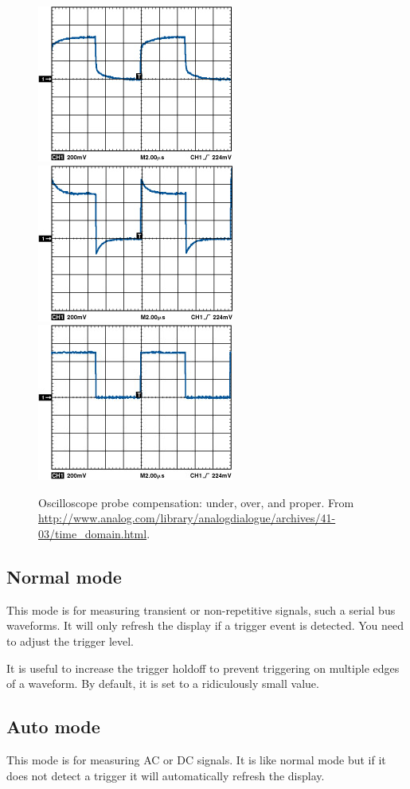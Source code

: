 \begin{figure}[!h]
  \centering
  \includegraphics[width=0.3\columnwidth]{figs/probe-undercompensated}
  \includegraphics[width=0.3\columnwidth]{figs/probe-overcompensated}
  \includegraphics[width=0.3\columnwidth]{figs/probe-compensated}
  \caption{Oscilloscope probe compensation: under, over, and proper.
    From
    \url{http://www.analog.com/library/analogdialogue/archives/41-03/time_domain.html}.}
\end{figure}


\subsection{Normal mode}
\label{normal-mode}

This mode is for measuring transient or non-repetitive signals, such a
serial bus waveforms. It will only refresh the display if a trigger
event is detected.  You need to adjust the trigger level.

It is useful to increase the trigger holdoff to prevent triggering on
multiple edges of a waveform.  By default, it is set to a ridiculously
small value.

\subsection{Auto mode}
\label{auto-mode}

This mode is for measuring AC or DC signals. It is like normal mode
but if it does not detect a trigger it will automatically refresh the
display.


